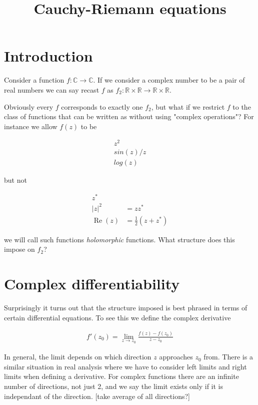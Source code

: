 \documentclass{article}
\title{Cauchy-Riemann equations}
\date{}
\begin{document}
\maketitle

\section{Introduction}

Consider a function $f:\mathbb{C} \rightarrow \mathbb{C}$. If we consider a complex number to be a pair of real numbers we can say recast $f$ as $f_2:\mathbb{R} \times \mathbb{R} \rightarrow \mathbb{R} \times \mathbb{R}$.

Obviously every $f$ corresponds to exactly one $f_2$, but what if we restrict $f$ to the class of functions that can be written as without using "complex operations"? For instance we allow $f(z)$ to be

\begin{align}
z^2 \\
sin(z)/z \\
log(z)
\end{align}

but not

\begin{align}
z^* \\
|z|^2 &= zz^* \\
\operatorname{Re}(z) &= \frac{1}{2}(z + z^*)
\end{align}

we will call such functions \emph{holomorphic} functions. What structure does this impose on $f_2$?

\section{Complex differentiability}

Surprisingly it turns out that the structure imposed is best phrased in terms of certain differential equations. To see this we define the complex derivative

\begin{align}
f'(z_0) = \lim_{z \rightarrow z_0} \frac{f(z) - f(z_0)}{z - z_0}
\end{align}

In general, the limit depends on which direction $z$ approaches $z_0$ from. There is a similar situation in real analysis where we have to consider left limits and right limits when defining a derivative. For complex functions there are an infinite number of directions, not just 2, and we say the limit exists only if it is independant of the direction. [take average of all directions?]
\end{document}
